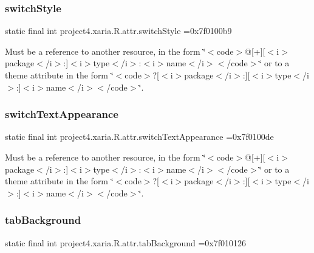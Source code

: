 \subsubsection{\texorpdfstring{switch\+Style}{switchStyle}}
{\footnotesize\ttfamily static final int project4.\+xaria.\+R.\+attr.\+switch\+Style =0x7f0100b9\hspace{0.3cm}{\ttfamily [static]}}

Must be a reference to another resource, in the form \char`\"{}$<$code$>$@\mbox{[}+\mbox{]}\mbox{[}$<$i$>$package$<$/i$>$\+:\mbox{]}$<$i$>$type$<$/i$>$\+:$<$i$>$name$<$/i$>$$<$/code$>$\char`\"{} or to a theme attribute in the form \char`\"{}$<$code$>$?\mbox{[}$<$i$>$package$<$/i$>$\+:\mbox{]}\mbox{[}$<$i$>$type$<$/i$>$\+:\mbox{]}$<$i$>$name$<$/i$>$$<$/code$>$\char`\"{}. \mbox{\label{classproject4_1_1xaria_1_1R_1_1attr_a55f0283498165fc1de323e1837ab600e}} 
\subsubsection{\texorpdfstring{switch\+Text\+Appearance}{switchTextAppearance}}
{\footnotesize\ttfamily static final int project4.\+xaria.\+R.\+attr.\+switch\+Text\+Appearance =0x7f0100de\hspace{0.3cm}{\ttfamily [static]}}

Must be a reference to another resource, in the form \char`\"{}$<$code$>$@\mbox{[}+\mbox{]}\mbox{[}$<$i$>$package$<$/i$>$\+:\mbox{]}$<$i$>$type$<$/i$>$\+:$<$i$>$name$<$/i$>$$<$/code$>$\char`\"{} or to a theme attribute in the form \char`\"{}$<$code$>$?\mbox{[}$<$i$>$package$<$/i$>$\+:\mbox{]}\mbox{[}$<$i$>$type$<$/i$>$\+:\mbox{]}$<$i$>$name$<$/i$>$$<$/code$>$\char`\"{}. \mbox{\label{classproject4_1_1xaria_1_1R_1_1attr_a1c0ef0fca9219899ea718d4b48bdc0c7}} 
\subsubsection{\texorpdfstring{tab\+Background}{tabBackground}}
{\footnotesize\ttfamily static final int project4.\+xaria.\+R.\+attr.\+tab\+Background =0x7f010126\hspace{0.3cm}{\ttfamily [static]}}

